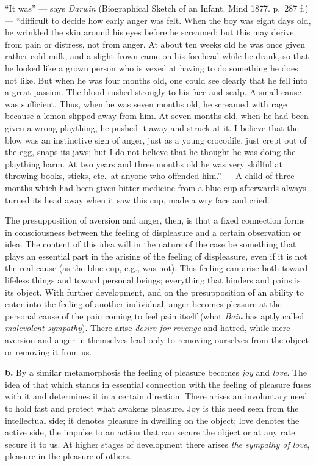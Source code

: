 \documentclass[12pt,a4paper]{book}
\newcommand{\opage}[1]{\marginnote{\footnotesize\textit{[#1]}}}
\begin{document}
``It was'' --- says \emph{Darwin} (Biographical Sketch of an Infant.
Mind 1877. p.~287 f.) --- ``difficult to decide how early anger was
felt. When the boy was eight days old, he wrinkled the skin around his
eyes before he screamed; but this may derive from pain or distress, not
from anger. At about ten weeks old he was once given rather cold milk,
and a slight frown came on his forehead while he drank, so that he
looked like a grown person who is vexed at having to do something he
does not like. But when he was four months old, one could see clearly
that he fell into a great passion. The blood rushed strongly to his face
and scalp. A small cause was sufficient. Thus, when he was seven months
old, he screamed with rage because a lemon slipped away from him. At
seven months old, when he had been given a wrong plaything, he pushed it
away and struck at it. I believe that the blow was an instinctive sign
of anger, just as a young crocodile, just crept out of the egg, snaps
its jaws; but I do not believe that he thought he was doing the plaything
harm. At two years and three months
\opage{283}old he was very skillful at throwing books, sticks, etc.\ at
anyone who offended him.'' --- A child of three months which had been
given bitter medicine from a blue cup afterwards always turned its head
away when it saw this cup, made a wry face and cried.

The presupposition of aversion and anger, then, is that a fixed
connection forms in consciousness between the feeling of displeasure and
a certain observation or idea. The content of this idea will in the
nature of the case be something that plays an essential part in the
arising of the feeling of displeasure, even if it is not the real cause
(as the blue cup, e.g., was not). This feeling can arise both toward
lifeless things and toward personal beings; everything that hinders and
pains is its object. With further development, and on the presupposition
of an ability to enter into the feeling of another individual, anger
becomes pleasure at the personal cause of the pain coming to feel pain
itself (what \emph{Bain} has aptly called \textit{malevolent sympathy}).
There arise \emph{desire for revenge} and hatred, while mere aversion
and anger in themselves lead only to removing ourselves from the object
or removing it from us.

\textbf{b.} By a similar metamorphosis the feeling of pleasure becomes
\emph{joy} and \emph{love}. The idea of that which stands in essential
connection with the feeling of pleasure fuses with it and determines it
in a certain direction. There arises an involuntary need to hold fast
and protect what awakens pleasure. Joy is this need seen from the
intellectual side; it denotes pleasure in dwelling on the object; love
denotes the active side, the impulse to an action that can secure the
object or at any rate secure it to us. At higher stages of development
there arises \emph{the sympathy of love}, pleasure in the pleasure of
others.
\end{document}
